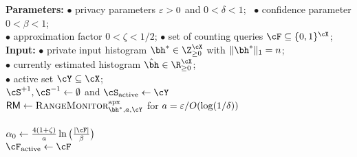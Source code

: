 \begin{algorithm}[t]
\small
\caption{$\FindMarginExample_{\cF,\eps,\delta,\beta,\zeta}$}
    \label{alg:find-example}
        \textbf{Parameters:}
            {\footnotesize $\bullet$ } privacy parameters $ \varepsilon >0$ and $0 < \delta < 1$; 
            \,
            {\footnotesize $\bullet$ } confidence parameter $0 < \beta < 1$;\\
            {\footnotesize $\bullet$ } approximation factor $0 < \zeta < 1 / 2$;
            \quad \quad \quad
            {\footnotesize $\bullet$ } set of counting queries $\cF\subseteq \{0, 1\}^{\cX}$;\\[-2mm]
        
        \textbf{Input:}
        {\footnotesize $\bullet$ } private input histogram $\bh^{\ast} \in \Z_{\ge 0}^{\cX}$ with $\|\bh^{\ast}\|_1=n$;\\
        {\footnotesize $\bullet$ } currently estimated histogram $\hbh\in \R_{\geq 0}^{\cX}$;\\
        {\footnotesize $\bullet$ } active set $\cY\subseteq \cX$;\\[-2mm]
        
        $\Splus, \Sminus \gets \emptyset$ and 
        $\Sactive \gets \cY$\\
        $\OIM \gets \OutsideIntervalMonitor^{\mathrm{apx}}_{\bh^{\ast},a,\cY}$ for $a = \varepsilon / O(\log(1/\delta))$\\[1mm]
        \mbox{}\\
        $\alpha_0\gets \frac{4(1+\zeta)}{a}\ln\big(\frac{|\cF|}{\beta}\big)$\\
        $\Factive\gets \cF$\; \hfill{}
        
\end{algorithm}
